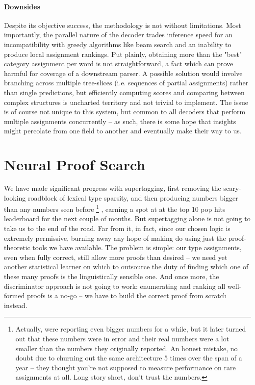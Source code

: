 \paragraph{Downsides}
Despite its objective success, the methodology is not without limitations.
Most importantly, the parallel nature of the decoder trades inference speed for an incompatibility with greedy algorithms like beam search and an inability to produce local assignment rankings.
Put plainly, obtaining more than the "best" category assignment per word is not straightforward, a fact which can prove harmful for coverage of a downstream parser.
A possible solution would involve branching across multiple tree-slices (i.e. sequences of partial assignments) rather than single predictions, but efficiently computing scores and comparing between complex structures is uncharted territory and not trivial to implement.
The issue is of course not unique to this system, but common to all decoders that perform multiple assignments concurrently -- as such, there is some hope that insights might percolate from one field to another and eventually make their way to us.

\section{Neural Proof Search}
We have made significant progress with supertagging, first removing the scary-looking roadblock of lexical type sparsity, and then producing numbers bigger than any numbers seen before%
	\footnote{Actually, \citet{tian2020supertagging} were reporting even bigger numbers for a while, but it later turned out that these numbers were in error and their real numbers were a lot smaller than the numbers they originally reported.
	An honest mistake, no doubt due to churning out the same architecture 5 times over the span of a year -- they thought you're not supposed to measure performance on rare assignments at all.
	Long story short, don't trust the numbers.}%
, earning a spot at at the top 10 pop hits leaderboard for the next couple of months.
But supertagging alone is not going to take us to the end of the road.
Far from it, in fact, since our chosen logic is extremely permissive, burning away any hope of making do using just the proof-theoretic tools we have available.
The problem is simple: our type assignments, even when fully correct, still allow more proofs than desired -- we need yet another statistical learner on which to outsource the duty of finding which one of these many proofs is the linguistically sensible one.
And once more, the discriminator approach is not going to work: enumerating and ranking all well-formed proofs is a no-go -- we have to build the correct proof from scratch instead.

